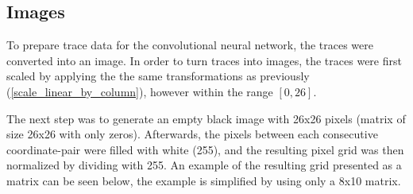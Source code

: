 \subsection{Images}

To prepare trace data for the convolutional neural network, the traces were converted into an image. In order to turn traces into images, the traces were first scaled by applying the the same transformations as previously (\ref{scale_linear_by_column}), however within the range $[0, 26]$.

The next step was to generate an empty black image with 26x26 pixels (matrix of size 26x26 with only zeros). Afterwards, the pixels between each consecutive coordinate-pair were filled with white (255), and the resulting pixel grid was then normalized by dividing with 255. An example of the resulting grid presented as a matrix can be seen below, the example is simplified by using only a 8x10 matrix.

